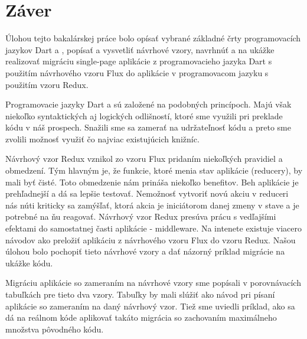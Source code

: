 \chapter*{Záver}  %

Úlohou tejto bakalárskej práce bolo opísať vybrané základné črty programovacích jazykov Dart a \JS{}, popísať a vysvetliť návrhové vzory, navrhnúť a na ukážke realizovať migráciu single-page aplikácie z programovacieho jazyka Dart s použitím návrhového vzoru Flux do aplikácie v programovacom jazyku \JS{} s použitím vzoru Redux.

Programovacie jazyky Dart a \JS{} sú založené na podobných princípoch. Majú však niekoľko syntaktických aj logických odlišností, ktoré sme využili pri preklade kódu v náš prospech. Snažili sme sa zamerať na udržateľnosť kódu a preto sme zvolili možnosť využiť čo najviac existujúcich knižníc.

Návrhový vzor Redux vznikol zo vzoru Flux pridaním niekoľkých pravidiel a obmedzení. Tým hlavným je, že funkcie, ktoré menia stav aplikácie (reducery), by mali byť čisté. Toto obmedzenie nám prináša niekoľko benefitov.
Beh aplikácie je prehľadnejší a dá sa lepšie testovať.
Nemožnosť vytvoriť novú akciu v reduceri nás núti kriticky sa zamýšľať, ktorá akcia je iniciátorom danej zmeny v stave a je potrebné na ňu reagovať. 
Návrhový vzor Redux presúva prácu s vedľajšími efektami do samostatnej časti aplikácie - middleware. 
Na intenete existuje viacero návodov ako preložiť aplikáciu z návrhového vzoru Flux do vzoru Redux. Našou úlohou bolo pochopiť tieto návrhové vzory a dať názorný príklad migrácie na ukážke kódu.

Migráciu aplikácie so zameraním na návrhové vzory sme popísali v porovnávacích tabuľkách pre tieto dva vzory. Tabuľky by mali slúžiť ako návod pri písaní aplikácie so zameraním na daný návrhový vzor. Tiež sme uviedli príklad, ako sa dá na reálnom kóde aplikovať takáto migrácia so zachovaním maximálneho množstva pôvodného kódu.


